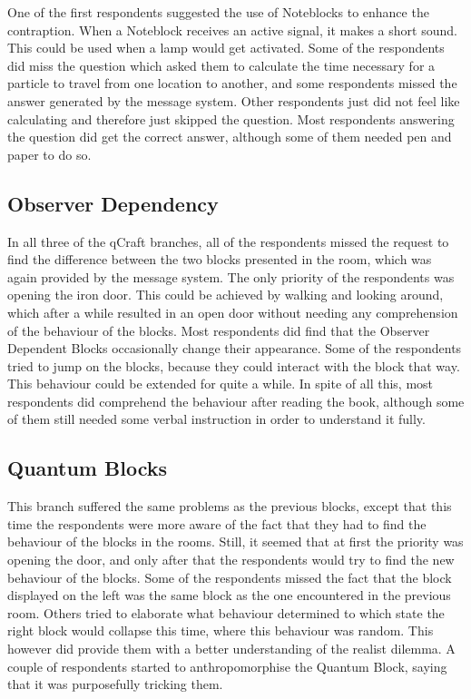 \documentclass[11pt,twoside]{report} %
\begin{document}
One of the first respondents suggested the use of Noteblocks to enhance the contraption. When a Noteblock receives an active signal, it makes a short sound. This could be used when a lamp would get activated. Some of the respondents did miss the question which asked them to calculate the time necessary for a particle to travel from one location to another, and some respondents missed the answer generated by the message system. Other respondents just did not feel like calculating and therefore just skipped the question. Most respondents answering the question did get the correct answer, although some of them needed pen and paper to do so.

\subsection{Observer Dependency}

In all three of the qCraft branches, all of the respondents missed the request to find the difference between the two blocks presented in the room, which was again provided by the message system. The only priority of the respondents was opening the iron door. This could be achieved by walking and looking around, which after a while resulted in an open door without needing any comprehension of the behaviour of the blocks. Most respondents did find that the Observer Dependent Blocks occasionally change their appearance. Some of the respondents tried to jump on the blocks, because they could interact with the block that way. This behaviour could be extended for quite a while. In spite of all this, most respondents did comprehend the behaviour after reading the book, although some of them still needed some verbal instruction in order to understand it fully.

\subsection{Quantum Blocks}

This branch suffered the same problems as the previous blocks, except that this time the respondents were more aware of the fact that they had to find the behaviour of the blocks in the rooms. Still, it seemed that at first the priority was opening the door, and only after that the respondents would try to find the new behaviour of the blocks. Some of the respondents missed the fact that the block displayed on the left was the same block as the one encountered in the previous room. Others tried to elaborate what behaviour determined to which state the right block would collapse this time, where this behaviour was random. This however did provide them with a better understanding of the realist dilemma. A couple of respondents started to anthropomorphise the Quantum Block, saying that it was purposefully tricking them.
\end{document}

